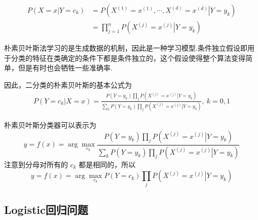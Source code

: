 \documentclass{hitreport}
\begin{document}
\begin{align}
	P\left( X=x\left| Y=c_k \right. \right) &=P\left( X^{\left( 1 \right)}=x^{\left( 1 \right)},\cdots ,X^{\left( d \right)}=x^{\left( d \right)}\left| Y=y_k \right. \right)\\
	&= \prod_{j=1}^n{P\left( X^{\left( j \right)}=x^{\left( j \right)}\left| Y=y_k \right. \right)}
\end{align}


朴素贝叶斯法学习的是生成数据的机制，因此是一种学习模型.条件独立假设即用于分类的特征在类确定的条件下都是条件独立的，这个假设使得整个算法变得简单，但是有时也会牺牲一些准确率.

因此，二分类的朴素贝叶斯的基本公式为
\begin{align}
P\left( Y=c_k\left| X=x \right. \right) =\frac{P\left( Y=y_k \right) \prod_j{P\left( X^{\left( j \right)}=x^{\left( j \right)}\left| Y=y_k \right. \right)}}{\sum_k{P\left( Y=y_k \right) \prod_j{P\left( X^{\left( j \right)}=x^{\left( j \right)}\left| Y=y_k \right. \right)}}},\ k=0,1
\end{align}

朴素贝叶斯分类器可以表示为
$$
y=f\left(x\right)=\arg \underset{c_k}{\max}\frac{P\left( Y=y_k \right) \prod_j{P\left( X^{\left( j \right)}=x^{\left( j \right)}\left| Y=y_k \right. \right)}}{\sum_k{P\left( Y=y_k \right) \prod_j{P\left( X^{\left( j \right)}=x^{\left( j \right)}\left| Y=y_k \right. \right)}}}
$$
注意到分母对所有的 $c_k$ 都是相同的，所以
$$
y=f\left(x\right)=\arg \underset{c_k}{\max}P\left( Y=c_k \right) \prod_j{P\left( X^{\left( j \right)}=x^{\left( j \right)}\left | Y=y_k \right. \right )}
$$

\subsection{Logistic回归问题}
\end{document}

